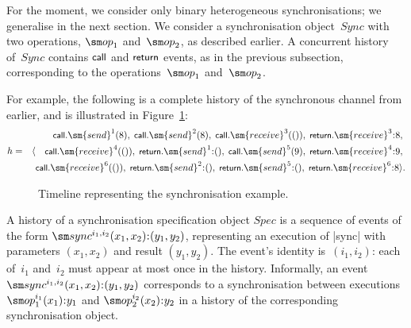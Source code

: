 For the moment, we consider only binary heterogeneous synchronisations; we
generalise in the next section.  We consider a synchronisation object~$Sync$
with two operations, $\op_1$ and~$\op_2$, as described earlier.  A concurrent
history of~$Sync$ contains $\mbox{\sf{\small call}}$ and $\mbox{\sf{\small return}}$ events, as in the previous
subsection, corresponding to the operations~$\op_1$ and~$\op_2$.

For example, the following is a complete history of the synchronous channel
from earlier, and is illustrated in Figure~\ref{fig:sync-timeline}:
\begin{eqnarray*}
h & = & 
\seq{\begin{align}
  \call.\sm{send}^1(8),\; \call.\sm{send}^2(8),\; \call.\sm{receive}^3(()),\;
  \return.\sm{receive}^3\::8,\; \\
  \call.\sm{receive}^4(()),\; \return.\sm{send}^1\::(),\;
  \call.\sm{send}^5(9),\; \return.\sm{receive}^4\::9,\; \\
  \call.\sm{receive}^6(()),\; \return.\sm{send}^2\::(), \;
  \return.\sm{send}^5\::(),\; \return.\sm{receive}^6\::8 } .
  \end{align}
\end{eqnarray*}


\begin{figure}
\unScalaMid
\begin{center}
\end{center}
\caption{Timeline representing the synchronisation example.}
\label{fig:sync-timeline}
\scalaMid
\end{figure}


A history of a synchronisation specification object $Spec$ is a sequence of
events of the form $\sync^{i_1, i_2}(x_1, x_2)\:: (y_1, y_2)$, representing an
execution of |sync| with parameters $(x_1, x_2)$ and result $(y_1,y_2)$.  The
event's  identity is~$(i_1,i_2)$: each of~$i_1$ and~$i_2$ must
appear at most once in the history.  Informally, an event $\sync^{i_1,
  i_2}(x_1, x_2)\:: (y_1, y_2)$ corresponds to a synchronisation between
executions $\op_1^{i_1}(x_1)\::y_1$ and $\op_2^{i_2}(x_2)\::y_2$ in a history
of the corresponding synchronisation object.

